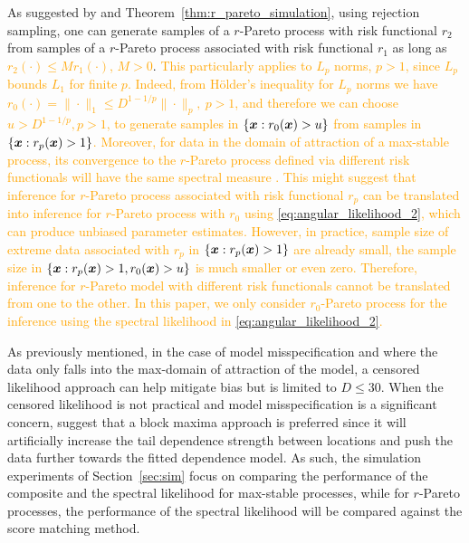\documentclass[12pt]{article}
\newcommand{\PZ}{\textcolor{orange}}
\begin{document}
As suggested by \citet[Proposition 2]{Dombry.etal:2024} and Theorem~\ref{thm:r_pareto_simulation}, using rejection sampling, one can generate samples of a $r$-Pareto process with risk functional $r_2$ from samples of a $r$-Pareto process associated with  risk functional $r_1$ as long as \PZ{$r_2(\cdot) \leq Mr_1(\cdot) $, $M>0$}. \PZ{This particularly applies to $L_p$ norms, $p>1$, since $L_{p}$ bounds $L_1$ for finite $p$. Indeed, from H\"older's inequality for $L_p$ norms we have $r_0(\cdot)=\|\cdot\|_1 \leq D^{1-1/p}\|\cdot\|_p,\ p>1$, and therefore we can choose $u>D^{1-1/p}, p>1$, to generate samples in $\{{\boldsymbol{x}}: r_0({\boldsymbol{x}}) > u \}$ from samples in $\{{\boldsymbol{x}}:r_p({\boldsymbol{x}}) > 1\}$. Moreover, for data in the domain of attraction of a max-stable process, its convergence to the $r$-Pareto process defined via different risk functionals will have the same spectral measure \citep[Theorem 1]{Dombry.Ribatet:2015}. This might suggest that inference for $r$-Pareto process associated with risk functional $r_p$ can be translated into inference for $r$-Pareto process with $r_0$ using \eqref{eq:angular_likelihood_2}, which can produce unbiased parameter estimates. However, in practice, sample size of extreme data associated with $r_p$ in $\{{\boldsymbol{x}}: r_p({\boldsymbol{x}}) > 1\}$ are already small, the sample size in $\{{\boldsymbol{x}}: r_p({\boldsymbol{x}})>1, r_0({\boldsymbol{x}})>u\}$ is much smaller or even zero. Therefore, inference for $r$-Pareto model with different risk functionals cannot be translated from one to the other. In this paper, we only consider $r_0$-Pareto process for the inference using the spectral likelihood in \eqref{eq:angular_likelihood_2}.} 



As previously mentioned, in the case of model misspecification and where the data only falls into the max-domain of attraction of the model, a censored likelihood approach can help mitigate bias \citep{Wadsworth.Tawn:2014, Huser.etal:2016} but is limited to $D\leq 30$. When the censored likelihood is not practical and model misspecification is a significant concern, \citet{Huser.etal:2016} suggest that a block maxima approach is preferred since it will artificially increase the tail dependence strength between locations and push the data further towards the fitted dependence model. 
% 
As such, the simulation experiments of Section~\ref{sec:sim} focus on comparing the performance of the composite and the spectral likelihood for max-stable processes, while for $r$-Pareto processes, the performance of the spectral likelihood will be compared against the score matching method.
\end{document}

